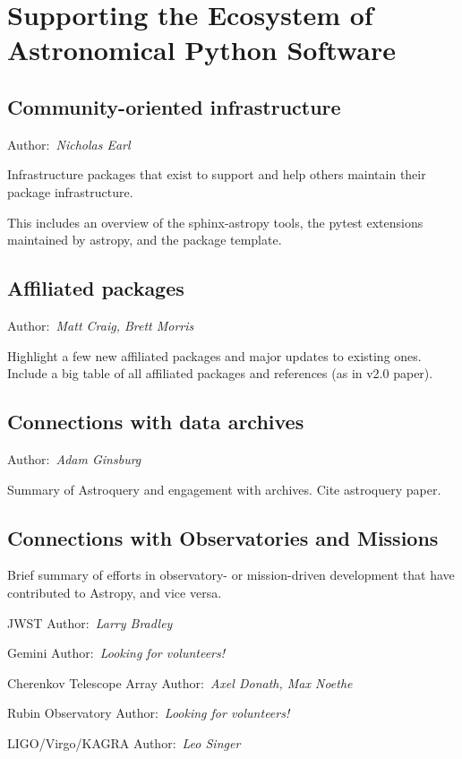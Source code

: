 \documentclass[modern]{aastex631}
\newcommand{\secauthor}[1]{{\color{blue}Author:~\textit{#1}}}
\newcommand{\secunfilled}{{\color{red}Author:~\textit{Looking for volunteers!}}}
\begin{document}
\section{Supporting the Ecosystem of Astronomical Python Software}
\label{sec:ecosystem}

\subsection{Community-oriented infrastructure}

\secauthor{Nicholas Earl}

Infrastructure packages that exist to support and help others maintain their
package infrastructure.

This includes an overview of the sphinx-astropy tools, the pytest extensions
maintained by astropy, and the package template.

\subsection{Affiliated packages}

\secauthor{Matt Craig, Brett Morris}

Highlight a few new affiliated packages and major updates to existing ones.
Include a big table of all affiliated packages and references (as in v2.0
paper).

\subsection{Connections with data archives}

\secauthor{Adam Ginsburg}

Summary of Astroquery and engagement with archives. Cite astroquery paper.

\subsection{Connections with Observatories and Missions}

Brief summary of efforts in observatory- or mission-driven development that have
contributed to Astropy, and vice versa.

JWST
\secauthor{Larry Bradley}

Gemini
\secunfilled

Cherenkov Telescope Array
\secauthor{Axel Donath, Max Noethe}

Rubin Observatory
\secunfilled

LIGO/Virgo/KAGRA
\secauthor{Leo Singer}
\end{document}
